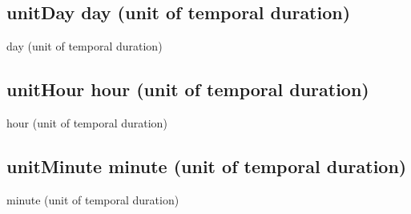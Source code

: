 \documentclass[letterpaper,10pt,english]{sphinxmanual}
\begin{document}
\subsection{unitDay \sphinxhyphen{} day (unit of temporal duration)}
\label{\detokenize{doc-unitDay:unitday-day-unit-of-temporal-duration}}\label{\detokenize{doc-unitDay:index-0}}\label{\detokenize{doc-unitDay::doc}}
\begin{sphinxShadowBox}

\sphinxAtStartPar
day (unit of temporal duration)
\end{sphinxShadowBox}
\begin{quote}

\ignorespaces \end{quote}


\subsection{unitHour \sphinxhyphen{} hour (unit of temporal duration)}
\label{\detokenize{doc-unitHour:unithour-hour-unit-of-temporal-duration}}\label{\detokenize{doc-unitHour:index-0}}\label{\detokenize{doc-unitHour::doc}}
\begin{sphinxShadowBox}

\sphinxAtStartPar
hour (unit of temporal duration)
\end{sphinxShadowBox}
\begin{quote}

\ignorespaces \end{quote}


\subsection{unitMinute \sphinxhyphen{} minute (unit of temporal duration)}
\label{\detokenize{doc-unitMinute:unitminute-minute-unit-of-temporal-duration}}\label{\detokenize{doc-unitMinute:index-0}}\label{\detokenize{doc-unitMinute::doc}}
\begin{sphinxShadowBox}

\sphinxAtStartPar
minute (unit of temporal duration)
\end{sphinxShadowBox}
\begin{quote}

\ignorespaces \end{quote}
\end{document}
